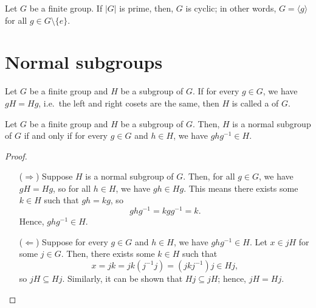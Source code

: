 \begin{cor}
Let $ G $ be a finite group. If $ \lvert G\rvert $ is prime, then, $ G $ is cyclic; in other words, $ G=\langle g\rangle $ for all $ g\in G\setminus\{e\} $.
\end{cor}

\section{Normal subgroups}

\begin{defn}
Let $ G $ be a finite group and $ H $ be a subgroup of $ G $. If for every $ g\in G $, we have $ gH=Hg $, i.e.\ the left and right cosets are the same, then $ H $ is called a  of $ G $.
\end{defn}

\begin{thm}\label{thm:normal_subgroup}
Let $ G $ be a finite group and $ H $ be a subgroup of $ G $. Then, $ H $ is a normal subgroup of $ G $ if and only if for every $ g\in G $ and $ h\in H $, we have $ ghg^{-1}\in H $.
\end{thm}
\begin{proof}~
\begin{enumerate}

\item[($ \Rightarrow $)] Suppose $ H $ is a normal subgroup of $ G $. Then, for all $ g\in G $, we have $ gH=Hg $, so for all $ h\in H $, we have $ gh\in Hg $. This means there exists some $ k\in H $ such that $ gh=kg $, so
\begin{equation*}
    ghg^{-1}=kgg^{-1}=k.
\end{equation*}
Hence, $ ghg^{-1}\in H $.

\item[($ \Leftarrow $)] Suppose for every $ g\in G $ and $ h\in H $, we have $ ghg^{-1}\in H $. Let $ x\in jH $ for some $ j\in G $. Then, there exists some $ k\in H $ such that
\begin{equation*}
    x=jk=jk(j^{-1}j)=(jkj^{-1})j\in Hj,
\end{equation*}
so $ jH\subseteq Hj $. Similarly, it can be shown that $ Hj\subseteq jH $; hence, $ jH=Hj $. \qedhere

\end{enumerate}
\end{proof}

